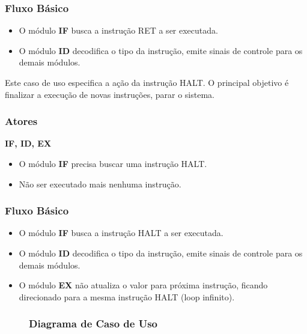 \subsubsection*{Fluxo Básico}
\begin{itemize}
	\item O módulo \textbf{IF} busca a instrução RET a ser executada.
	\item O módulo \textbf{ID} decodifica o tipo da instrução, emite sinais de controle para os demais módulos.
\end{itemize}


Este caso de uso especifica a ação da instrução HALT. O principal objetivo é finalizar a execução de novas instruções, parar o sistema.

\subsubsection*{Atores}
\textbf{IF, ID, EX}

\preconditions 
\begin{itemize}
	\item O módulo \textbf{IF} precisa buscar uma instrução HALT.
\end{itemize}

\postconditions
\begin{itemize}
	\item Não ser executado mais nenhuma instrução.
\end{itemize}

\subsubsection*{Fluxo Básico}
\begin{itemize}
	\item O módulo \textbf{IF} busca a instrução HALT a ser executada.
	\item O módulo \textbf{ID} decodifica o tipo da instrução, emite sinais de controle para os demais módulos.
	\item O módulo \textbf{EX} não atualiza o valor para próxima instrução, ficando direcionado para a mesma instrução HALT (loop infinito).
\end{itemize}

\begin{figure}[htpb!]
	\subsubsection*{Diagrama de Caso de Uso}
	
\end{figure}
